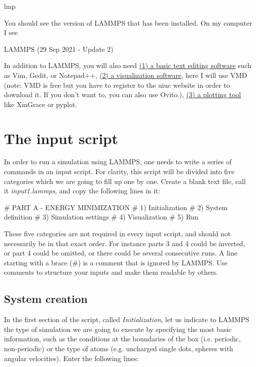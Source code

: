 \begin{lcverbatim}
lmp
\end{lcverbatim}

\noindent You should see the version of LAMMPS that has been
installed. On my computer I see

\begin{lcverbatim}
LAMMPS (29 Sep 2021 - Update 2)
\end{lcverbatim}

\noindent In addition to LAMMPS, you will also need \href{https://help.gnome.org/users/gedit/stable/}{(1) a basic text editing software}
such as Vim, Gedit, or Notepad++, \href{https://www.ks.uiuc.edu/Research/vmd/}{(2) a visualization software}, here I
will use VMD (note: VMD is free but you have to register to
the uiuc website in order to download it. If you don't want
to, you can also use Ovito.), \href{https://plasma-gate.weizmann.ac.il/Grace/}{(3) a plotting tool} like
XmGrace or pyplot.

\section{The input script}

\noindent In order to run a simulation using LAMMPS, one needs to
write a series of commands in an input script. For clarity,
this script will be divided into five categories which we are going to
fill up one by one. Create a blank text file, call it
\textit{input1.lammps}, and copy the following lines in it:

\begin{lcverbatim}
# PART A - ENERGY MINIMIZATION
# 1) Initialization
# 2) System definition
# 3) Simulation settings
# 4) Visualization
# 5) Run
\end{lcverbatim}

\noindent These five categories are not required in every
input script, and should not necessarily be in that
exact order. For instance parts 3 and 4 could be inverted, or
part 4 could be omitted, or there could be several
consecutive runs.
A line starting with a brace ($\#$) is a comment
that is ignored by LAMMPS. Use comments to structure 
your inputs and make them readable by others.

\subsection{System creation}

\noindent In the first section of the script, called \textit{Initialization},
let us indicate to LAMMPS the type of simulation we are
going to execute by specifying the most basic information,
such as the conditions at the boundaries of the box (i.e.
periodic, non-periodic) or the type of atoms (e.g. uncharged
single dots, spheres with angular velocities). Enter the
following lines:

